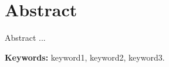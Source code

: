 \documentclass[11pt,twoside,a4paper]{book}
\begin{document}
\chapter*{Abstract}
Abstract ...

\noindent \textbf{Keywords:} keyword1, keyword2, keyword3.

\tableofcontents    %



\listoffigures            
\listoftables            

\mainmatter
\end{document}
